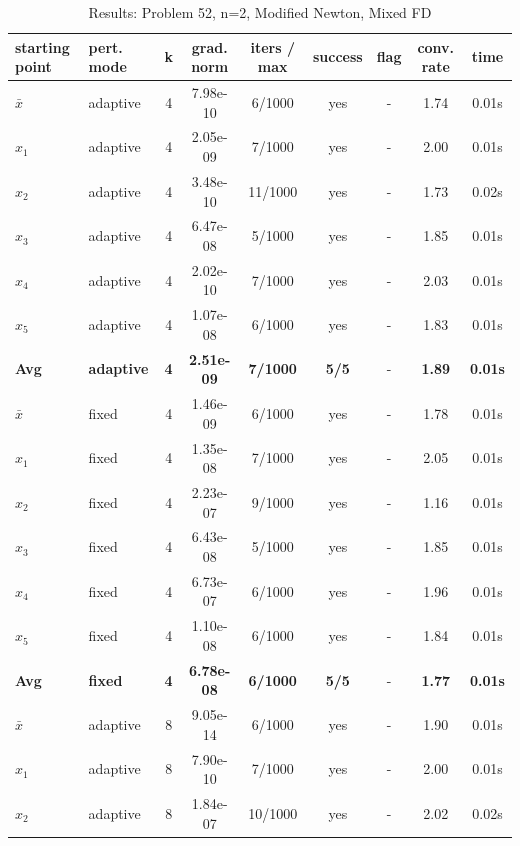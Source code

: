 \begin{longtable}{|l|l|c|c|c|c|c|c|c|}
\caption{Results: Problem 52, n=2, Modified Newton, Mixed FD} \\
\hline
\textbf{starting point} & \textbf{pert. mode} & \textbf{k} & \textbf{grad. norm} & \textbf{iters / max} & \textbf{success} & \textbf{flag} & \textbf{conv. rate} & \textbf{time} \\
\hline
\endfirsthead
\endhead
\endfoot
\hline
\endlastfoot
$\bar{x}$ & adaptive & 4 & 7.98e-10 & 6/1000 & yes & - & 1.74 & 0.01s \\
\hline
$x_1$ & adaptive & 4 & 2.05e-09 & 7/1000 & yes & - & 2.00 & 0.01s \\
\hline
$x_2$ & adaptive & 4 & 3.48e-10 & 11/1000 & yes & - & 1.73 & 0.02s \\
\hline
$x_3$ & adaptive & 4 & 6.47e-08 & 5/1000 & yes & - & 1.85 & 0.01s \\
\hline
$x_4$ & adaptive & 4 & 2.02e-10 & 7/1000 & yes & - & 2.03 & 0.01s \\
\hline
$x_5$ & adaptive & 4 & 1.07e-08 & 6/1000 & yes & - & 1.83 & 0.01s \\
\hline
\hline\hline
\textbf{Avg} & \textbf{adaptive} & \textbf{4} & \textbf{2.51e-09} & \textbf{7/1000} & \textbf{5/5} & - & \textbf{1.89} & \textbf{0.01s} \\
\hline\hline
\hline
$\bar{x}$ & fixed & 4 & 1.46e-09 & 6/1000 & yes & - & 1.78 & 0.01s \\
\hline
$x_1$ & fixed & 4 & 1.35e-08 & 7/1000 & yes & - & 2.05 & 0.01s \\
\hline
$x_2$ & fixed & 4 & 2.23e-07 & 9/1000 & yes & - & 1.16 & 0.01s \\
\hline
$x_3$ & fixed & 4 & 6.43e-08 & 5/1000 & yes & - & 1.85 & 0.01s \\
\hline
$x_4$ & fixed & 4 & 6.73e-07 & 6/1000 & yes & - & 1.96 & 0.01s \\
\hline
$x_5$ & fixed & 4 & 1.10e-08 & 6/1000 & yes & - & 1.84 & 0.01s \\
\hline
\hline\hline
\textbf{Avg} & \textbf{fixed} & \textbf{4} & \textbf{6.78e-08} & \textbf{6/1000} & \textbf{5/5} & - & \textbf{1.77} & \textbf{0.01s} \\
\hline\hline
$\bar{x}$ & adaptive & 8 & 9.05e-14 & 6/1000 & yes & - & 1.90 & 0.01s \\
\hline
$x_1$ & adaptive & 8 & 7.90e-10 & 7/1000 & yes & - & 2.00 & 0.01s \\
\hline
$x_2$ & adaptive & 8 & 1.84e-07 & 10/1000 & yes & - & 2.02 & 0.02s \\

\end{longtable}
